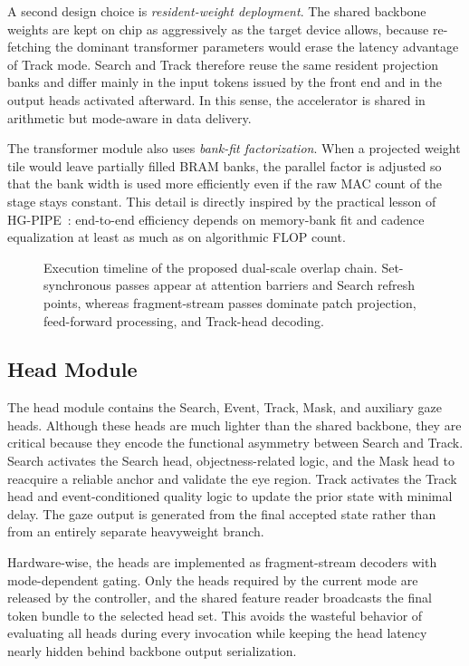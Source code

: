 \documentclass[journal]{IEEEtran}
\newcommand{\placeholderfigure}[2]{%
  \fbox{\parbox[c][#2][c]{#1}{\centering\vspace{2mm}\textbf{Figure placeholder}\\Final artwork pending\vspace{2mm}}}}
\begin{document}
A second design choice is \emph{resident-weight deployment}. The shared backbone weights are kept on chip as aggressively as the target device allows, because re-fetching the dominant transformer parameters would erase the latency advantage of Track mode. Search and Track therefore reuse the same resident projection banks and differ mainly in the input tokens issued by the front end and in the output heads activated afterward. In this sense, the accelerator is shared in arithmetic but mode-aware in data delivery.

The transformer module also uses \emph{bank-fit factorization}. When a projected weight tile would leave partially filled BRAM banks, the parallel factor is adjusted so that the bank width is used more efficiently even if the raw MAC count of the stage stays constant. This detail is directly inspired by the practical lesson of HG-PIPE~\cite{ref11}: end-to-end efficiency depends on memory-bank fit and cadence equalization at least as much as on algorithmic FLOP count.

\begin{figure}[t]
\centering
\placeholderfigure{0.93\textwidth}{1.95in}
\caption{Execution timeline of the proposed dual-scale overlap chain. Set-synchronous passes appear at attention barriers and Search refresh points, whereas fragment-stream passes dominate patch projection, feed-forward processing, and Track-head decoding.}
\label{fig:hw_timeline}
\end{figure}

\subsection{Head Module}
The head module contains the Search, Event, Track, Mask, and auxiliary gaze heads. Although these heads are much lighter than the shared backbone, they are critical because they encode the functional asymmetry between Search and Track. Search activates the Search head, objectness-related logic, and the Mask head to reacquire a reliable anchor and validate the eye region. Track activates the Track head and event-conditioned quality logic to update the prior state with minimal delay. The gaze output is generated from the final accepted state rather than from an entirely separate heavyweight branch.

Hardware-wise, the heads are implemented as fragment-stream decoders with mode-dependent gating. Only the heads required by the current mode are released by the controller, and the shared feature reader broadcasts the final token bundle to the selected head set. This avoids the wasteful behavior of evaluating all heads during every invocation while keeping the head latency nearly hidden behind backbone output serialization.
\end{document}
